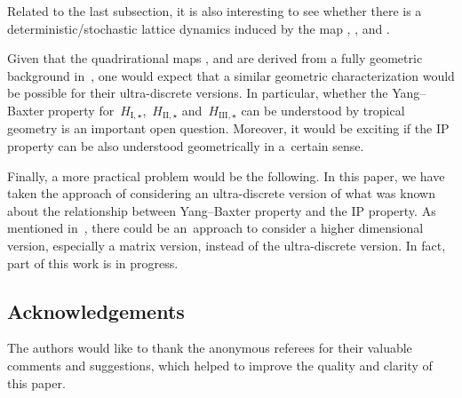 \documentclass[pdftex]{sigma}
\numberwithin{equation}{section}
\begin{document}
Related to the last subsection, it is also interesting to see whether there is a deterministic/stochastic lattice dynamics induced by the map , ,  and .

Given that the quadrirational maps ,  and  are derived from a fully geometric background in~\cite{ABS, PSTV}, one would expect that a similar geometric characterization would be possible for their ultra-discrete versions. In particular, whether the Yang--Baxter property for~$H_{\mathrm{I},\star}$,~$H_{\mathrm{II},\star}$ and~$H_{\mathrm{III},\star}$ can be understood by tropical geometry is an important open question. Moreover, it would be exciting if the IP property can be also understood geometrically in a~certain sense.

Finally, a more practical problem would be the following. In this paper, we have taken the approach of considering an ultra-discrete version of what was known about the relationship between Yang--Baxter property and the IP property. As mentioned in~\cite{SU}, there could be an~approach to consider a higher dimensional version, especially a matrix version, instead of the ultra-discrete version. In fact, part of this work is in progress.


\subsection*{Acknowledgements}
The authors would like to thank the anonymous referees for their valuable comments and suggestions, which helped to improve the quality and clarity of this paper.

%
%
\end{document}
